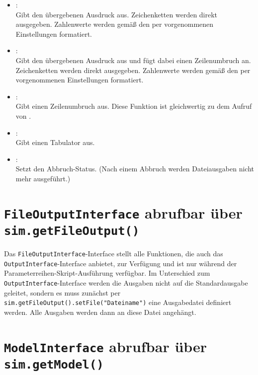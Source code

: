 \begin{itemize}
\item
{}:\\
Gibt den übergebenen Ausdruck aus.
Zeichenketten werden direkt ausgegeben. Zahlenwerte werden gemäß den per
 vorgenommenen Einstellungen formatiert.

\item
{}:\\
Gibt den übergebenen Ausdruck aus und fügt dabei einen Zeilenumbruch an.
Zeichenketten werden direkt ausgegeben. Zahlenwerte werden gemäß den per
 vorgenommenen Einstellungen formatiert.

\item
{}:\\
Gibt einen Zeilenumbruch aus. Diese Funktion ist gleichwertig zu dem Aufruf von
.

\item
{}:\\
Gibt einen Tabulator aus.

\item
{}:\\
Setzt den Abbruch-Status. (Nach einem Abbruch werden Dateiausgaben nicht mehr ausgeführt.)

\end{itemize}



\chapter{\texttt{FileOutputInterface} abrufbar über \texttt{sim.getFileOutput()}}

Das \texttt{FileOutputInterface}-Interface stellt alle Funktionen, die auch das
\texttt{OutputInterface}-Interface anbietet, zur Verfügung und ist nur während
der Parameterreihen-Skript-Ausführung verfügbar. Im Unterschied
zum \texttt{OutputInterface}-Interface werden die Ausgaben nicht auf die Standardausgabe
geleitet, sondern es muss zunächst per \texttt{sim.getFileOutput().setFile("{}Dateiname")}
eine Ausgabedatei definiert werden. Alle Ausgaben werden dann an diese
Datei angehängt.



\chapter{\texttt{ModelInterface} abrufbar über \texttt{sim.getModel()}}

